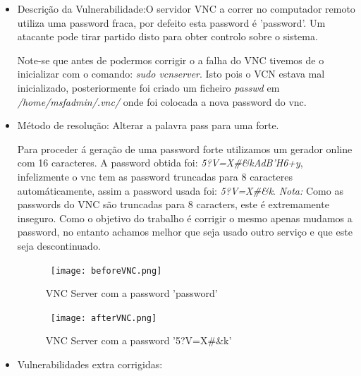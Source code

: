 \begin{itemize}
\item Descrição da Vulnerabilidade:O servidor VNC a correr no computador remoto utiliza uma password fraca, por defeito esta password é 'password'. Um atacante pode tirar partido disto para obter controlo sobre o sistema.
\par Note-se que antes de podermos corrigir o a falha do VNC tivemos de o inicializar com o comando: \textit{sudo vcnserver}. Isto pois o VCN estava mal inicializado, posteriormente foi criado um ficheiro \textit{passwd} em \textit{/home/msfadmin/.vnc/} onde foi colocada a nova password do vnc.

\item Método de resolução: Alterar a palavra pass para uma forte.
\par Para proceder á geração de uma password forte utilizamos um gerador online com 16 caracteres. A password obtida foi: \textit{5?V=X\#\&kAdB'H6+y}, infelizmente o vnc tem as password truncadas para 8 caracteres automáticamente, assim a password usada foi: \textit{5?V=X\#\&k}.\newline
\textit{Nota:} Como as passwords do VNC são truncadas para 8 caracters, este é extremamente inseguro. Como o objetivo do trabalho é corrigir o mesmo apenas mudamos a password, no entanto achamos melhor que seja usado outro serviço e que este seja descontinuado.
\begin{figure}[H]

  \centering

  \hbox{\hspace{-6em} \texttt{[image: beforeVNC.png]}}

  \caption {VNC Server com a password 'password'}

  \label {fig3}

\end{figure}
\begin{figure}[H]

  \centering

  \hbox{\hspace{-6em} \texttt{[image: afterVNC.png]}}

  \caption {VNC Server com a password '5?V=X\#\&k'}

  \label {fig3}

\end{figure}
\item Vulnerabilidades extra corrigidas:
\end{itemize}
